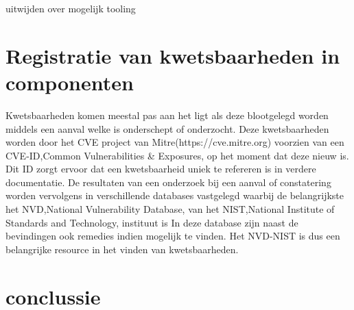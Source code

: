 uitwijden over mogelijk tooling
\section{Registratie van kwetsbaarheden in componenten}\label{sec:registratie-van-kwetsbaarheden-in-bibliotheken}
Kwetsbaarheden komen meestal pas aan het ligt als deze blootgelegd worden middels een aanval welke is onderschept of onderzocht. Deze kwetsbaarheden worden door het CVE project van Mitre(https://cve.mitre.org) voorzien van een CVE-ID,Common Vulnerabilities & Exposures, op het moment dat deze nieuw is. Dit ID zorgt ervoor dat een kwetsbaarheid uniek te refereren is in verdere documentatie. De resultaten van een onderzoek bij een aanval of constatering worden vervolgens in verschillende databases vastgelegd waarbij de belangrijkste het NVD,National Vulnerability Database,  van het NIST,National Institute of Standards and Technology, instituut is
In deze database zijn naast de bevindingen ook remedies indien mogelijk te vinden. Het NVD-NIST is dus een belangrijke resource in het vinden van kwetsbaarheden.

\section{conclussie}\label{sec:conclussie}
